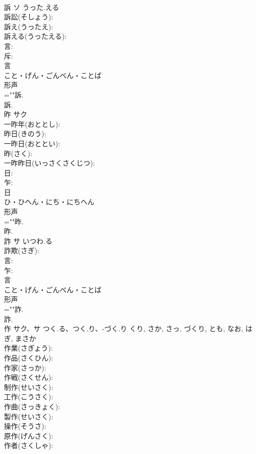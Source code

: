 \documentclass[8pt]{extreport}
\begin{document}
\begin{CJK}{UTF8}{min}
\\	訴	ソ	うった.える		
\\	訴訟(そしょう): 
\\	訴え(うったえ): 
\\	訴える(うったえる): 
\\	言: 
\\	斥: 
\\	言	
\\	こと・げん・ごんべん・ことば	
\\	形声 
\\	=""訴.
\\	訴.
\\	昨	サク			
\\	一昨年(おととし): 
\\	昨日(きのう): 
\\	一昨日(おととい): 
\\	昨(さく): 
\\	一昨昨日(いっさくさくじつ): 
\\	日: 
\\	乍: 
\\	日	
\\	ひ・ひへん・にち・にちへん	
\\	形声 
\\	=""昨.
\\	昨.
\\	詐	サ	いつわ.る		
\\	詐欺(さぎ): 
\\	言: 
\\	乍: 
\\	言	
\\	こと・げん・ごんべん・ことば	
\\	形声 
\\	=""詐.
\\	詐.
\\	作	サク、サ	つく.る、つく.り、-づく.り	くり, さか, さっ, づくり, とも, なお, はぎ, まさか	
\\	作業(さぎょう): 
\\	作品(さくひん): 
\\	作家(さっか): 
\\	作戦(さくせん): 
\\	制作(せいさく): 
\\	工作(こうさく): 
\\	作曲(さっきょく): 
\\	製作(せいさく): 
\\	操作(そうさ): 
\\	原作(げんさく): 
\\	作者(さくしゃ): 

\end{CJK}
\end{document}
